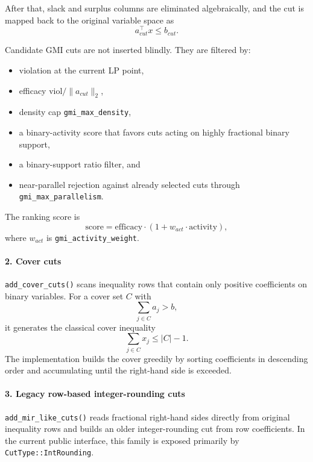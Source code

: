 After that, slack and surplus columns are eliminated algebraically, and the cut is mapped back to the original variable space as
\begin{equation}
  a_{cut}^\top x \le b_{cut}.
\end{equation}

Candidate GMI cuts are not inserted blindly. They are filtered by:
\begin{itemize}
  \item violation at the current LP point,
  \item efficacy \(\text{viol}/\lVert a_{cut} \rVert_2\),
  \item density cap \texttt{gmi\_max\_density},
  \item a binary-activity score that favors cuts acting on highly fractional binary support,
  \item a binary-support ratio filter, and
  \item near-parallel rejection against already selected cuts through \texttt{gmi\_max\_parallelism}.
\end{itemize}

The ranking score is
\begin{equation}
  \text{score} = \text{efficacy} \cdot \left(1 + w_{act} \cdot \text{activity}\right),
\end{equation}
where \(w_{act}\) is \texttt{gmi\_activity\_weight}.

\paragraph{2. Cover cuts}
\texttt{add\_cover\_cuts()} scans inequality rows that contain only positive coefficients on binary variables. For a cover set \(C\) with
\begin{equation}
  \sum_{j\in C} a_j > b,
\end{equation}
it generates the classical cover inequality
\begin{equation}
  \sum_{j\in C} x_j \le |C| - 1.
\end{equation}
The implementation builds the cover greedily by sorting coefficients in descending order and accumulating until the right-hand side is exceeded.

\paragraph{3. Legacy row-based integer-rounding cuts}
\texttt{add\_mir\_like\_cuts()} reads fractional right-hand sides directly from original inequality rows and builds an older integer-rounding cut from row coefficients. In the current public interface, this family is exposed primarily by \texttt{CutType::IntRounding}.

